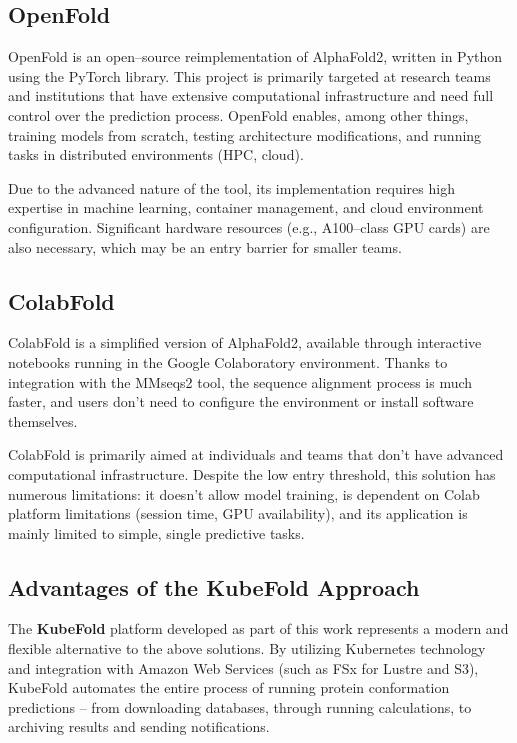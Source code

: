 \subsection*{OpenFold}

OpenFold is an open--source reimplementation of AlphaFold2, written in Python using the PyTorch library.
This project is primarily targeted at research teams and institutions that have extensive computational infrastructure and need full control over the prediction process.
OpenFold enables, among other things, training models from scratch, testing architecture modifications, and running tasks in distributed environments (HPC, cloud).

Due to the advanced nature of the tool, its implementation requires high expertise in machine learning, container management, and cloud environment configuration.
Significant hardware resources (e.g., A100--class GPU cards) are also necessary, which may be an entry barrier for smaller teams.

\subsection*{ColabFold}

ColabFold is a simplified version of AlphaFold2, available through interactive notebooks running in the Google Colaboratory environment.
Thanks to integration with the MMseqs2 tool, the sequence alignment process is much faster, and users don't need to configure the environment or install software themselves.

ColabFold is primarily aimed at individuals and teams that don't have advanced computational infrastructure.
Despite the low entry threshold, this solution has numerous limitations: it doesn't allow model training, is dependent on Colab platform limitations (session time, GPU availability), and its application is mainly limited to simple, single predictive tasks.

\subsection*{Advantages of the KubeFold Approach}

The \textbf{KubeFold} platform developed as part of this work represents a modern and flexible alternative to the above solutions.
By utilizing Kubernetes technology and integration with Amazon Web Services (such as FSx for Lustre and S3), KubeFold automates the entire process of running protein conformation predictions – from downloading databases, through running calculations, to archiving results and sending notifications.

